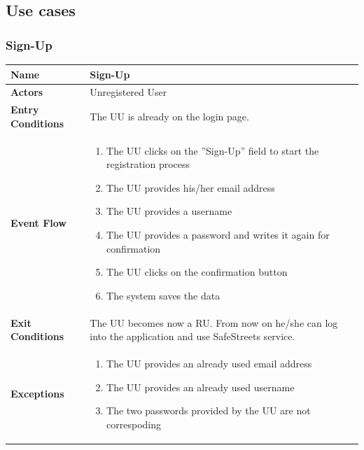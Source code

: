 			\subsection{Use cases}
				\subsubsection{Sign-Up}
					\begin{table}[!h]
						\centering
						\begin{tabular}{lp{}}
							\toprule
							\textbf{Name} & \textbf{Sign-Up} \\[1mm]
							\midrule
							\textbf{Actors} & Unregistered User \\[1mm]
							\textbf{Entry Conditions} & The UU is already on the login page. \vspace{1mm}\\
							\textbf{Event Flow} &
							\vspace{-5mm} 
							\begin{enumerate}
								\setlength\itemsep{0.5mm}
								\item The UU clicks on the ''Sign-Up'' field to start the registration process
								\item The UU provides his/her email address
								\item The UU provides a username
								\item The UU provides a password and writes it again for confirmation
								\item The UU clicks on the confirmation button
								\item The system saves the data
							\end{enumerate} \\
							\textbf{Exit Conditions} & The UU becomes now a RU. From now on he/she can log into the  application and use SafeStreets service. \vspace{1mm}\\
							
							\textbf{Exceptions} &
							\vspace{-5mm} 
							\begin{enumerate}
								\item The UU provides an already used email address
								\item The UU provides an already used username
								\item The two passwords provided by the UU are not correspoding
							\end{enumerate}
							\vspace{-7mm}

\end{tabular}
\end{table}
